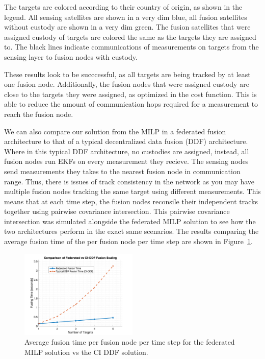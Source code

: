     The targets are colored according to their country of origin, as shown in the legend.
    All sensing satellites are shown in a very dim blue, all fusion satellites without custody are shown in a very dim green. 
    The fusion satellites that were assigned custody of targets are colored the same as the targets they are assigned to.
    The black lines indicate communications of measurements on targets from the sensing layer to fusion nodes with custody.

    These results look to be succcessful, as all targets are being tracked by at least one fusion node. 
    Additionally, the fusion nodes that were assigned custody are close to the targets they were assigned, as optimized in the cost function. 
    This is able to reduce the amount of communication hops required for a measurement to reach the fusion node.
    
    We can also compare our solution from the MILP in a federated fusion architecture to that of a typical decentralized data fusion (DDF) architecture.
    Where in this typical DDF architecture, no custodies are assigned, instead, all fusion nodes run EKFs on every measurement they recieve. The sensing nodes send measurements they takes to the nearest fusion node in communication range.
    Thus, there is issues of track consistency in the network as you may have multiple fusion nodes tracking the same target using different measurements.
    This means that at each time step, the fusion nodes reconsile their independent tracks together using pairwise covariance intersection. 
    This pairwise covariance intersection was simulated alongside the federated MILP solution to see how the two architectures perform in the exact same scenarios.
    The results comparing the average fusion time of the per fusion node per time step are shown in Figure~\ref{fig:federated_vs_ddf}.

    \begin{figure}[h]
        \centering
        \includegraphics[width=0.5\textwidth]{figs/ci_vs_federated.png}
        \caption{Average fusion time per fusion node per time step for the federated MILP solution vs the CI DDF solution.}
        \label{fig:federated_vs_ddf}
    \end{figure}

